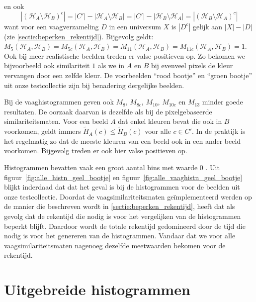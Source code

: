 en ook
\begin{displaymath}
|(\mathcal{H}_A  \setminus \mathcal{H}_B)^c|=|C'|-|\mathcal{H}_A \setminus \mathcal{H}_B|=|C'|-|\mathcal{H}_B \setminus \mathcal{H}_A|=|(\mathcal{H}_B  \setminus \mathcal{H}_A)^c|
\end{displaymath}
want voor een vaagverzameling $D$ in een universum $X$ is $|D^c|$ gelijk aan $|X|-|D|$ (zie \ref{sectie:beperken_rekentijd}). Bijgevolg geldt:
$M_5(\mathcal{H}_A,\mathcal{H}_B)=M_{5c}(\mathcal{H}_A,\mathcal{H}_B)=M_{11}(\mathcal{H}_A,\mathcal{H}_B)=M_{11c}(\mathcal{H}_A,\mathcal{H}_B)=1$.
Ook bij meer realistische beelden treden er valse positieven op. Zo bekomen 
we bijvoorbeeld ook similariteit $1$ als we in $A$ en $B$ bij evenveel pixels de kleur vervangen door 
een zelfde kleur. De voorbeelden ``rood bootje'' en ``groen bootje'' uit onze testcollectie zijn bij 
benadering dergelijke beelden. 

Bij de vaaghistogrammen geven ook $M_8$, $M_{8c}$, $M_{10}$, $M_{10c}$ en $M_{13}$ minder goede resultaten.
De oorzaak daarvan is dezelfde als bij de pixelgebaseerde similariteitsmaten. Voor een beeld $A$ dat enkel
kleuren bevat die ook in $B$ voorkomen, geldt immers $\widetilde{H}_A(c) \leq \widetilde{H}_B(c)$ voor 
alle $c \in C'$. In de praktijk is het regelmatig zo dat de meeste kleuren van een beeld ook in een
ander beeld voorkomen. Bijgevolg treden er ook hier valse positieven op.

Histogrammen bevatten vaak een groot aantal bins met waarde $0$ \cite{berens:compressed_colour_histograms}. Uit 
figuur~\ref{fig:alle_histn_geel_bootje} en figuur~\ref{fig:alle_vaaghistn_geel_bootje} blijkt 
inderdaad dat dat het geval is bij de histogrammen voor de beelden uit onze testcollectie. 
Doordat de vaagsimilariteitsmaten ge\"implementeerd werden op de manier die beschreven wordt in 
\ref{sectie:beperken_rekentijd}, heeft dat als gevolg dat de rekentijd die nodig is voor het 
vergelijken van de histogrammen beperkt blijft. Daardoor wordt de totale rekentijd gedomineerd door 
de tijd die nodig is voor het genereren van de histogrammen. Vandaar dat we voor alle 
vaagsimilariteitsmaten nagenoeg dezelfde meetwaarden bekomen voor de rekentijd. 


\section{Uitgebreide histogrammen}


